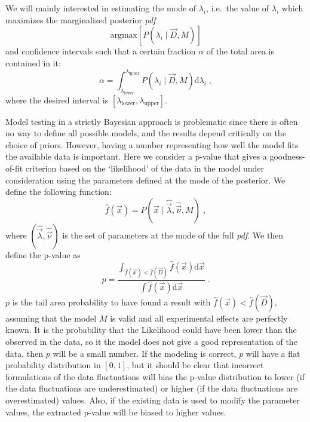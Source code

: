 We will mainly interested in estimating the mode of $\lambda_i$, i.e.~the value of $\lambda_i$ which maximizes the marginalized posterior \emph{pdf}
\begin{equation}\text{argmax}\left[ P(\lambda_i\mid\vec{D},M) \right]\end{equation}
and confidence intervals such that a certain fraction $\alpha$ of the total area is contained in it:
\begin{equation}\alpha=\int^{\lambda_\text{upper}}_{\lambda_\text{lower}}P(\lambda_i\mid\vec{D},M)\text{d}\lambda_i\;,\end{equation}
where the desired interval is $[\lambda_\text{lower},\lambda_\text{upper}]$.

 Model testing in a strictly Bayesian approach is problematic since there is often no way to define all possible models, and the results depend critically on the choice of priors. However, having a number representing how well the model fits the available data is important. Here we consider a p-value that gives a goodness-of-fit criterion based on the `likelihood' of the data in the model under consideration using the parameters defined at the mode of the posterior. We define the following function:
\begin{equation}\hat{f}(\vec{x})=P(\vec{x}\mid\hat{\vec{\lambda}},\hat{\vec{\nu}},M)\;,\end{equation}
where $(\hat{\vec{\lambda}},\hat{\vec{\nu}})$ is the set of parameters at the mode of the full \emph{pdf}. We then define the p-value as
\begin{equation}p=\frac{\int_{\hat{f}(\vec{x})<\hat{f}(\vec{D})}\hat{f}(\vec{x})\text{d}\vec{x}}{\int \hat{f}(\vec{x})\text{d}\vec{x}}\;.\label{eq:pvalue}\end{equation}
$p$ is the tail area probability to have found a result with $\hat{f}(\vec{x})<\hat{f}(\vec{D})$, assuming that the model $M$ is valid and all experimental effects are perfectly known. It is the probability that the Likelihood could have been lower than the observed in the data, so it the model does not give a good representation of the data, then $p$ will be a small number. If the modeling is correct, $p$ will have a flat probability distribution in $[0,1]$, but it should be clear that incorrect formulations of the data fluctuations will bias the p-value distribution to lower (if the data fluctuations are underestimated) or higher (if the data fluctuations are overestimated) values. Also, if the existing data is used to modify the parameter values, the extracted p-value will be biased to higher values.

